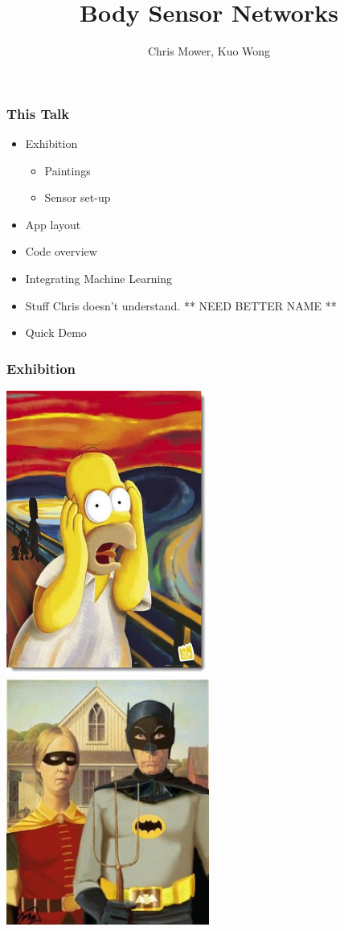 \documentclass{beamer}
\title{Body Sensor Networks}
\author{Chris Mower, Kuo Wong}
\date{}
\begin{document}
\maketitle

\begin{frame}\frametitle{This Talk}
	\begin{itemize}
		\item Exhibition
		\begin{itemize}
		\item Paintings
		\item Sensor set-up
		\end{itemize}
		\item App layout
		\item Code overview
		\item Integrating Machine Learning
		\item Stuff Chris doesn't understand. ** NEED BETTER NAME **
		\item Quick Demo
	\end{itemize}
\end{frame}

\begin{frame}\frametitle{Exhibition}
\includegraphics[width=0.5\textwidth,height=0.8\textheight]{img-homer.jpg}%
\includegraphics[width=0.5\textwidth,height=0.8\textheight]{img-batman.jpg}

\end{frame}
\end{document}
